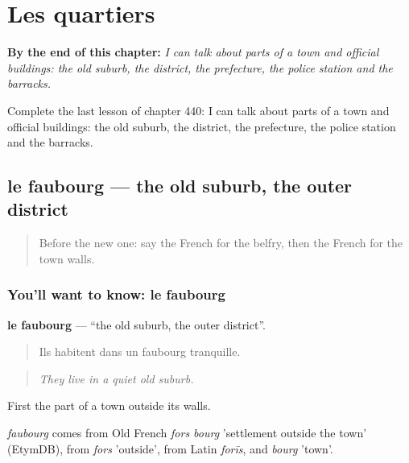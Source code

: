 
\chapter{Les quartiers}
\label{ch:fr-les-quartiers}

\begin{chapteropening}
\textbf{By the end of this chapter:} \emph{I can talk about parts of a town and official buildings: the old suburb, the district, the prefecture, the police station and the barracks.}

Complete the last lesson of chapter 440: I can talk about parts of a town and official buildings: the old suburb, the district, the prefecture, the police station and the barracks.
\end{chapteropening}

\section[le faubourg]{le faubourg — the old suburb, the outer district}

\label{lesson:FR-C440-faubourg}



\begin{quote}
Before the new one: say the French for the belfry, then the French for the town walls.
\end{quote}

\subsection*{You'll want to know: le faubourg}
\textbf{le faubourg} — \textquotedblleft{}the old suburb, the outer district\textquotedblright{}.

\begin{quote}
Ils habitent dans un faubourg tranquille.
\end{quote}

\begin{quote}
\emph{They live in a quiet old suburb.}
\end{quote}

First the part of a town outside its walls.

\begin{cousinweb}
\emph{faubourg} comes from Old French \emph{fors bourg} 'settlement outside the town' (EtymDB), from \emph{fors} 'outside', from Latin \emph{forīs}, and \emph{bourg} 'town'.
\end{cousinweb}

